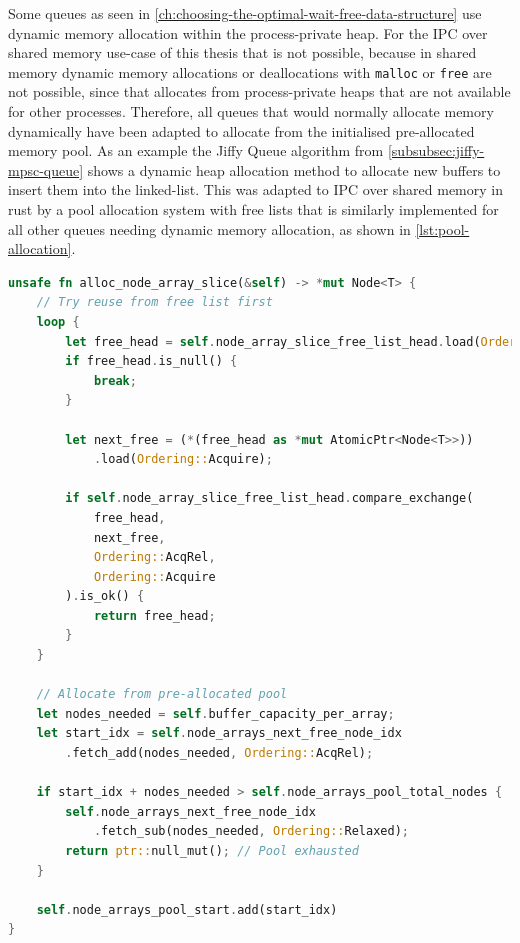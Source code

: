 Some queues as seen in \cref{ch:choosing-the-optimal-wait-free-data-structure} use dynamic memory allocation within the process-private heap. For the \ac{IPC} over shared memory use-case of this thesis that is not possible, because in shared memory dynamic memory allocations or deallocations with \texttt{malloc} or \texttt{free} are not possible, since that allocates from process-private heaps that are not available for other processes. Therefore, all queues that would normally allocate memory dynamically have been adapted to allocate from the initialised pre-allocated memory pool. As an example the Jiffy Queue algorithm from \cref{subsubsec:jiffy-mpsc-queue} shows a dynamic heap allocation method to allocate new buffers to insert them into the linked-list. This was adapted to \ac{IPC} over shared memory in rust by a pool allocation system with free lists that is similarly implemented for all other queues needing dynamic memory allocation, as shown in \cref{lst:pool-allocation}.

\begin{lstlisting}[language=Rust, style=boxed, caption={Lock-free memory pool allocation}, label={lst:pool-allocation}]
unsafe fn alloc_node_array_slice(&self) -> *mut Node<T> {
    // Try reuse from free list first
    loop {
        let free_head = self.node_array_slice_free_list_head.load(Ordering::Acquire);
        if free_head.is_null() {
            break;
        }
        
        let next_free = (*(free_head as *mut AtomicPtr<Node<T>>))
            .load(Ordering::Acquire);
            
        if self.node_array_slice_free_list_head.compare_exchange(
            free_head, 
            next_free, 
            Ordering::AcqRel, 
            Ordering::Acquire
        ).is_ok() {
            return free_head;
        }
    }
    
    // Allocate from pre-allocated pool
    let nodes_needed = self.buffer_capacity_per_array;
    let start_idx = self.node_arrays_next_free_node_idx
        .fetch_add(nodes_needed, Ordering::AcqRel);
        
    if start_idx + nodes_needed > self.node_arrays_pool_total_nodes {
        self.node_arrays_next_free_node_idx
            .fetch_sub(nodes_needed, Ordering::Relaxed);
        return ptr::null_mut(); // Pool exhausted
    }
    
    self.node_arrays_pool_start.add(start_idx)
}
\end{lstlisting}

